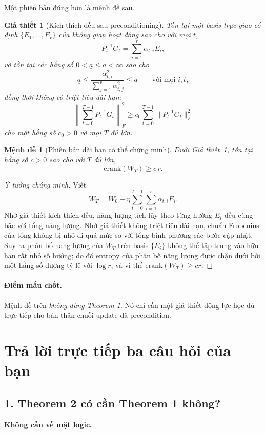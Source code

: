 \documentclass[11pt,a4paper]{article}
\newtheorem{proposition}{Mệnh đề}
\newtheorem{assumption}{Giả thiết}
\newcommand{\erank}{\mathrm{erank}}
\begin{document}
\noindent
Một phiên bản đúng hơn là mệnh đề sau.

\begin{assumption}[Kích thích đều sau preconditioning]
\label{ass:persistent-precond}
Tồn tại một basis trực giao cố định $\{E_1,\dots,E_r\}$ của không gian hoạt động sao cho với mọi $t$,
\[
P_t^{-1}G_t = \sum_{i=1}^r \alpha_{t,i} E_i,
\]
và tồn tại các hằng số $0<\underline{a}\le \overline{a}<\infty$ sao cho
\[
\underline{a}
\le
\frac{\alpha_{t,i}^2}{\sum_{j=1}^r \alpha_{t,j}^2}
\le
\overline{a}
\qquad
\text{với mọi } i,t,
\]
đồng thời không có triệt tiêu dài hạn:
\[
\left\|\sum_{t=0}^{T-1}P_t^{-1}G_t\right\|_F^2
\ge
c_0\sum_{t=0}^{T-1}\|P_t^{-1}G_t\|_F^2
\]
cho một hằng số $c_0>0$ và mọi $T$ đủ lớn.
\end{assumption}

\begin{proposition}[Phiên bản dài hạn có thể chứng minh]
\label{prop:long-run}
Dưới Giả thiết~\ref{ass:persistent-precond}, tồn tại hằng số $c>0$ sao cho với $T$ đủ lớn,
\[
\erank(W_T)\ge c\,r.
\]
\end{proposition}

\begin{proof}[Ý tưởng chứng minh]
Viết
\[
W_T = W_0 - \eta\sum_{t=0}^{T-1}\sum_{i=1}^r \alpha_{t,i}E_i.
\]
Nhờ giả thiết kích thích đều, năng lượng tích lũy theo từng hướng $E_i$ đều cùng bậc với tổng năng lượng. Nhờ giả thiết không triệt tiêu dài hạn, chuẩn Frobenius của tổng không bị nhỏ đi quá mức so với tổng bình phương các bước cập nhật. Suy ra phân bố năng lượng của $W_T$ trên basis $\{E_i\}$ không thể tập trung vào hữu hạn rất nhỏ số hướng; do đó entropy của phân bố năng lượng được chặn dưới bởi một hằng số dương tỷ lệ với $\log r$, và vì thế $\erank(W_T)\ge cr$.
\end{proof}

\paragraph{Điểm mấu chốt.}
Mệnh đề trên \emph{không dùng Theorem 1}. Nó chỉ cần một giả thiết động lực học đủ trực tiếp cho bản thân chuỗi update đã precondition.

\section*{Trả lời trực tiếp ba câu hỏi của bạn}

\subsection*{1. Theorem 2 có cần Theorem 1 không?}
\textbf{Không cần về mặt logic.}
\end{document}
